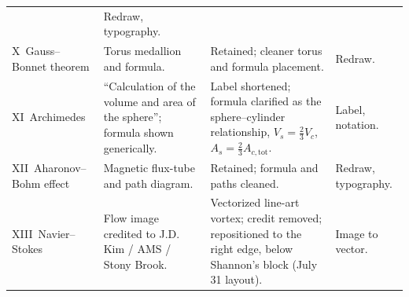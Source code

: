 \documentclass[10pt]{article}
\begin{document}
\begin{longtable}{@{}L{2.55cm} L{4.6cm} L{5.5cm} L{2.9cm}@{}}
  & Redraw, typography.\\
X~Gauss--Bonnet theorem & Torus medallion and formula. & Retained;
  cleaner torus and formula placement. & Redraw.\\
XI~Archimedes & ``Calculation of the volume and area of the sphere'';
  formula shown generically. & Label shortened; formula clarified as
  the sphere--cylinder relationship, $V_s=\tfrac{2}{3}V_c$,
  $A_s=\tfrac{2}{3}A_{c,\mathrm{tot}}$. & Label, notation.\\
XII~Aharonov--Bohm effect & Magnetic flux-tube and path diagram. &
  Retained; formula and paths cleaned. & Redraw, typography.\\
XIII~Navier--Stokes & Flow image credited to J.D. Kim / AMS / Stony
  Brook. & Vectorized line-art vortex; credit removed; repositioned to
  the right edge, below Shannon's block (July 31 layout). & Image to
  vector.\\
\bottomrule
\end{longtable}
\end{document}
